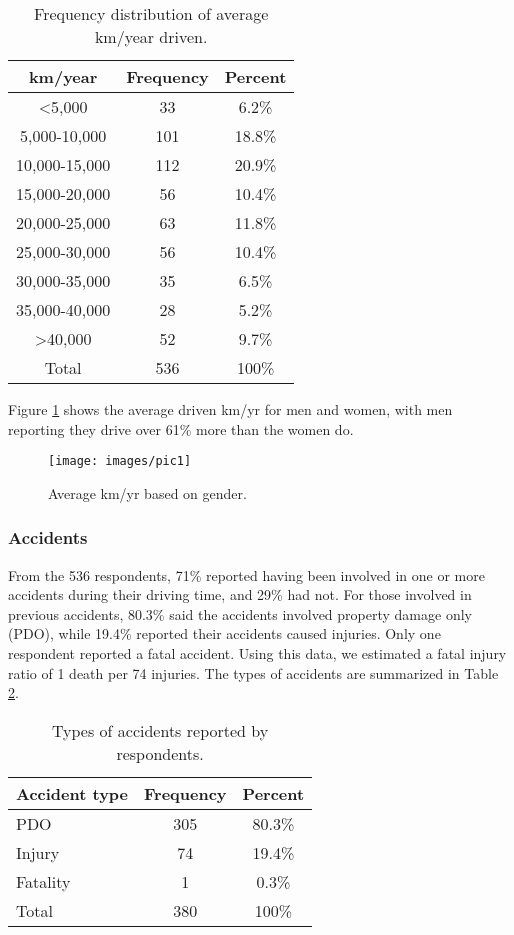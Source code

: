 \documentclass[preprint,12pt,a4paper,authoryear]{elsarticle}
\begin{document}
\begin{table}[H]
\centering
\caption{Frequency distribution of average km/year driven.}
\label{tab:annualkm}
\begin{tabular}{@{}ccc@{}}
\toprule
\textbf{km/year} & \textbf{Frequency} & \textbf{Percent} \\ \midrule
\textless5,000 & 33 & 6.2\% \\
5,000-10,000 & 101 & 18.8\% \\
10,000-15,000 & 112 & 20.9\% \\
15,000-20,000 & 56 & 10.4\% \\
20,000-25,000 & 63 & 11.8\% \\
25,000-30,000 & 56 & 10.4\% \\
30,000-35,000 & 35 & 6.5\% \\
35,000-40,000 & 28 & 5.2\% \\
\textgreater40,000 & 52 & 9.7\% \\
Total & 536 & 100\% \\ \bottomrule
\end{tabular}
\end{table}

Figure \ref{fig:avekmgender} shows the average driven km/yr for men and women, with men reporting they drive over 61\% more than the women do.
%
\begin{figure}[H]
\centering
\texttt{[image: images/pic1]}  %
\caption{Average km/yr based on gender.}
\label{fig:avekmgender}
\end{figure}
%

\subsubsection{Accidents}
From the 536 respondents, 71\% reported having been involved in one or more accidents during their driving time, and 29\% had not. For those involved in previous accidents, 80.3\%  said the accidents involved property damage only (PDO), while 19.4\% reported their accidents caused injuries. Only one respondent reported a fatal accident. Using this data, we estimated a fatal injury ratio of 1 death per 74 injuries. The types of accidents are summarized in Table \ref{tab:accidents}.

\begin{table}[H]
\centering
\caption{Types of accidents reported by respondents.}
\label{tab:accidents}
\begin{tabular}{@{}lcc@{}}
\toprule
\textbf{Accident type} & \textbf{Frequency} & \textbf{Percent} \\ \midrule
PDO & 305 & 80.3\% \\
Injury & 74 & 19.4\% \\
Fatality & 1 & 0.3\% \\
Total & 380 & 100\% \\ \bottomrule
\end{tabular}
\end{table}
\end{document}
